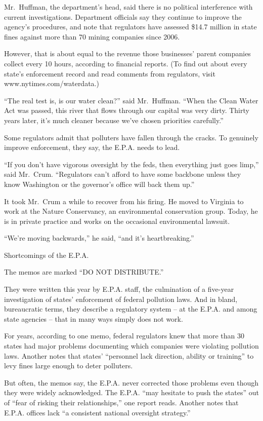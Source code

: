 ﻿\documentclass[12pt]{article}
\begin{document}
Mr.~Huffman, the department's head, said there is no political interference with current
investigations. Department officials say they continue to improve the agency's procedures, and note
that regulators have assessed \$14.7 million in state fines against more than 70 mining companies
since 2006.

However, that is about equal to the revenue those businesses' parent companies collect every 10
hours, according to financial reports. (To find out about every state's enforcement record and read
comments from regulators, visit www.nytimes.com/waterdata.)

``The real test is, is our water clean?'' said Mr.~Huffman. ``When the Clean Water Act was passed,
this river that flows through our capital was very dirty. Thirty years later, it's much cleaner
because we've chosen priorities carefully.''

Some regulators admit that polluters have fallen through the cracks. To genuinely improve
enforcement, they say, the E.P.A. needs to lead.

``If you don't have vigorous oversight by the feds, then everything just goes limp,'' said Mr.~Crum.
``Regulators can't afford to have some backbone unless they know Washington or the governor's office
will back them up.''

It took Mr.~Crum a while to recover from his firing. He moved to Virginia to work at the Nature
Conservancy, an environmental conservation group. Today, he is in private practice and works on the
occasional environmental lawsuit.

``We're moving backwards,'' he said, ``and it's heartbreaking.''

Shortcomings of the E.P.A.

The memos are marked ``DO NOT DISTRIBUTE.''

They were written this year by E.P.A. staff, the culmination\cite{culmination} of a five-year
investigation of states' enforcement of federal pollution laws. And in bland, bureaucratic terms,
they describe a regulatory system -- at the E.P.A. and among state agencies -- that in many ways
simply does not work.

For years, according to one memo, federal regulators knew that more than 30 states had major
problems documenting which companies were violating pollution laws. Another notes that states'
``personnel lack direction, ability or training'' to levy fines large enough to deter polluters.

But often, the memos say, the E.P.A. never corrected those problems even though they were widely
acknowledged. The E.P.A. ``may hesitate to push the states'' out of ``fear of risking their
relationships,'' one report reads. Another notes that E.P.A. offices lack ``a consistent national
oversight strategy.''
\end{document}
